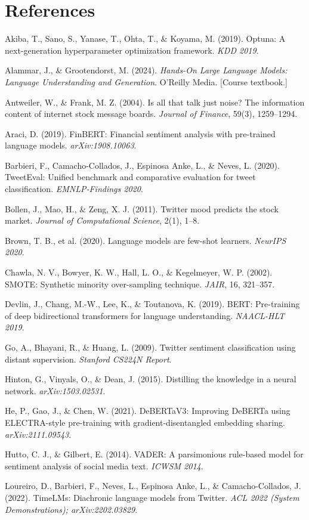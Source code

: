 \documentclass[11pt,a4paper]{article}
\begin{document}
\section*{References}
{\small
Akiba, T., Sano, S., Yanase, T., Ohta, T., \& Koyama, M. (2019). Optuna: A next-generation
hyperparameter optimization framework. \emph{KDD 2019}.

Alammar, J., \& Grootendorst, M. (2024). \emph{Hands-On Large Language Models: Language
Understanding and Generation}. O'Reilly Media. [Course textbook.]

Antweiler, W., \& Frank, M. Z. (2004). Is all that talk just noise? The information content of
internet stock message boards. \emph{Journal of Finance}, 59(3), 1259--1294.

Araci, D. (2019). FinBERT: Financial sentiment analysis with pre-trained language models.
\emph{arXiv:1908.10063}.

Barbieri, F., Camacho-Collados, J., Espinosa Anke, L., \& Neves, L. (2020). TweetEval: Unified
benchmark and comparative evaluation for tweet classification. \emph{EMNLP-Findings 2020}.

Bollen, J., Mao, H., \& Zeng, X. J. (2011). Twitter mood predicts the stock market. \emph{Journal of
Computational Science}, 2(1), 1--8.

Brown, T. B., et al. (2020). Language models are few-shot learners. \emph{NeurIPS 2020}.

Chawla, N. V., Bowyer, K. W., Hall, L. O., \& Kegelmeyer, W. P. (2002). SMOTE: Synthetic minority
over-sampling technique. \emph{JAIR}, 16, 321--357.

Devlin, J., Chang, M.-W., Lee, K., \& Toutanova, K. (2019). BERT: Pre-training of deep
bidirectional transformers for language understanding. \emph{NAACL-HLT 2019}.

Go, A., Bhayani, R., \& Huang, L. (2009). Twitter sentiment classification using distant
supervision. \emph{Stanford CS224N Report}.

Hinton, G., Vinyals, O., \& Dean, J. (2015). Distilling the knowledge in a neural network.
\emph{arXiv:1503.02531}.

He, P., Gao, J., \& Chen, W. (2021). DeBERTaV3: Improving DeBERTa using ELECTRA-style pre-training
with gradient-disentangled embedding sharing. \emph{arXiv:2111.09543}.

Hutto, C. J., \& Gilbert, E. (2014). VADER: A parsimonious rule-based model for sentiment analysis
of social media text. \emph{ICWSM 2014}.

Loureiro, D., Barbieri, F., Neves, L., Espinosa Anke, L., \& Camacho-Collados, J. (2022). TimeLMs:
Diachronic language models from Twitter. \emph{ACL 2022 (System Demonstrations); arXiv:2202.03829}.

}
\end{document}
